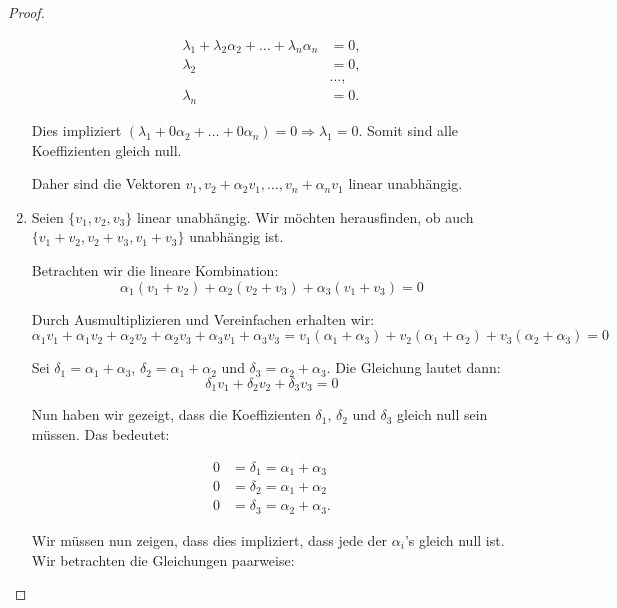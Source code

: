 \documentclass{../problemset}
\begin{document}
\begin{problem}
\begin{proof}
\begin{enumerate}
		      \begin{align*}
			      \lambda_1 + \lambda_2\alpha_2 + \ldots + \lambda_n\alpha_n & = 0,    \\
			      \lambda_2                                                  & = 0,    \\
			                                                                 & \ldots, \\
			      \lambda_n                                                  & = 0.
		      \end{align*}

		      Dies impliziert $(\lambda_1 + 0\alpha_2 + \ldots + 0\alpha_n) = 0 \Rightarrow \lambda_1 = 0$.
		      Somit sind alle Koeffizienten gleich null.

		      Daher sind die Vektoren $v_1, v_2 + \alpha_2v_1, \ldots, v_n + \alpha_nv_1$ linear unabhängig.

		\item Seien \(\{v_1, v_2, v_3\}\) linear unabhängig. Wir möchten herausfinden, ob auch \(\{v_1+v_2, v_2+v_3, v_1+v_3\}\) unabhängig ist.

		      Betrachten wir die lineare Kombination:
		      \[
			      \alpha_1(v_1+v_2) + \alpha_2(v_2+v_3) + \alpha_3(v_1+v_3) = 0
		      \]

		      Durch Ausmultiplizieren und Vereinfachen erhalten wir:
		      \[
			      \alpha_1v_1 + \alpha_1v_2 + \alpha_2v_2 + \alpha_2v_3 + \alpha_3v_1 + \alpha_3v_3 = v_1(\alpha_1+\alpha_3) + v_2(\alpha_1+\alpha_2) + v_3(\alpha_2+\alpha_3) = 0
		      \]

		      Sei \(\delta_1 = \alpha_1 + \alpha_3\), \(\delta_2 = \alpha_1 + \alpha_2\) und \(\delta_3 = \alpha_2 + \alpha_3\). Die Gleichung lautet dann:
		      \[
			      \delta_1v_1 + \delta_2v_2 + \delta_3v_3 = 0
		      \]

		      Nun haben wir gezeigt, dass die Koeffizienten \(\delta_1\), \(\delta_2\) und \(\delta_3\) gleich null sein müssen. Das bedeutet:

		      \begin{align*}
			      0 & = \delta_1 = \alpha_1 + \alpha_3  \\
			      0 & = \delta_2 = \alpha_1 + \alpha_2  \\
			      0 & = \delta_3 = \alpha_2 + \alpha_3.
		      \end{align*}

		      Wir müssen nun zeigen, dass dies impliziert, dass jede der \(\alpha_i\)'s gleich null ist. Wir betrachten die Gleichungen paarweise:


\end{enumerate}
\end{proof}
\end{problem}
\end{document}
